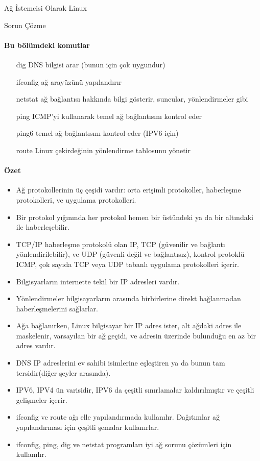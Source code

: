 \begin{section}{Ağ İstemcisi Olarak Linux}
\begin{subsection}{Sorun Çözme}
\paragraph{Bu bölümdeki komutlar}{
\begin{itemize}
\item[dig]DNS bilgisi arar (bunun için çok uygundur)
\item[ifconfig]ağ arayüzünü yapılandırır
\item[netstat]ağ bağlantısı hakkında bilgi gösterir, suncular, yönlendirmeler gibi
\item[ping]ICMP'yi kullanarak temel ağ bağlantısını kontrol eder
\item[ping6]temel ağ bağlantısını kontrol eder (IPV6 için)
\item[route]Linux çekirdeğinin yönlendirme tablosunu yönetir
\end{itemize}}

\paragraph{Özet}{
\begin{itemize}
\item Ağ protokollerinin üç çeşidi vardır: orta erişimli protokoller, haberleşme protokolleri, ve uygulama protokolleri.
\item Bir protokol yığınında her protokol hemen bir üstündeki ya da bir altındaki ile haberleşebilir.
\item TCP/IP haberleşme protokolü olan IP, TCP (güvenilir ve bağlantı yönlendirilebilir), ve UDP (güvenli değil ve bağlantısız), kontrol protoklü ICMP, çok sayıda TCP veya UDP tabanlı uygulama protokolleri içerir.
\item Bilgisyarların internette tekil bir IP adresleri vardır.
\item Yönlendirmeler bilgisayarların arasında birbirlerine direkt bağlanmadan haberleşmelerini sağlarlar.
\item Ağa bağlanırken, Linux bilgisayar bir IP adres ister, alt ağdaki adres ile maskelenir, varsayılan bir ağ geçidi, ve adresin üzerinde bulunduğu en az bir adres vardır. 
\item DNS IP adreslerini ev sahibi isimlerine eşleştiren ya da bunun tam tersidir(diğer şeyler arasında).
\item IPV6, IPV4 ün varisidir, IPV6 da çeşitli sınırlamalar kaldırılmıştır ve çeşitli gelişmeler içerir. 
\item ifconfig ve route ağı elle yapılandırmada kullanılır. Dağıtımlar ağ yapılandırması için çeşitli şemalar kullanırlar. 
\item ifconfig, ping, dig ve netstat programları iyi ağ sorunu çözümleri için kullanılır.
\end{itemize}
}
\end{subsection}
\end{section}

